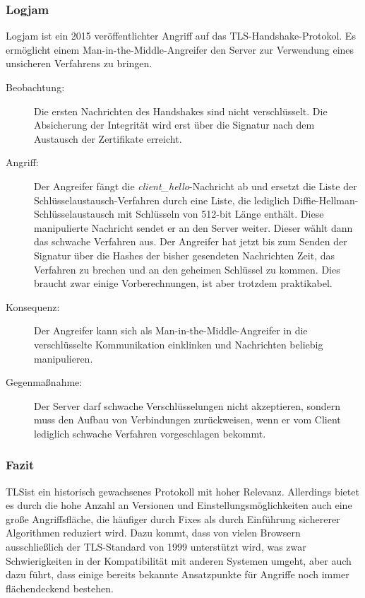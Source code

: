 \subsubsection{Logjam}
Logjam\cite{Adrian2015} ist ein 2015 veröffentlichter Angriff auf das
TLS-Handshake-Protokol. Es ermöglicht einem Man-in-the-Middle-Angreifer
den Server zur Verwendung eines unsicheren Verfahrens zu bringen.
\begin{description}
\item[Beobachtung:] 
  Die ersten Nachrichten des Handshakes sind nicht verschlüsselt. Die
  Absicherung der Integrität wird erst über die Signatur nach dem
  Austausch der Zertifikate erreicht.
\item[Angriff:] Der Angreifer fängt die \emph{client\_hello}-Nachricht ab
  und ersetzt die Liste der Schlüsselaustausch-Verfahren durch eine
  Liste, die lediglich Diffie-Hellman-Schlüsselaustausch mit Schlüsseln
  von 512-bit Länge enthält. Diese manipulierte Nachricht sendet er an
  den Server weiter. Dieser wählt dann das schwache Verfahren aus.
  Der Angreifer hat jetzt bis zum Senden der Signatur über die Hashes
  der bisher gesendeten Nachrichten Zeit, das Verfahren zu brechen und
  an den geheimen Schlüssel zu kommen. Dies braucht zwar einige
  Vorberechnungen, ist aber trotzdem praktikabel.
\item[Konsequenz:] Der Angreifer kann sich als
  Man-in-the-Middle-Angreifer in die verschlüsselte Kommunikation
  einklinken und Nachrichten beliebig manipulieren.
\item[Gegenmaßnahme:] Der Server darf schwache Verschlüsselungen nicht
  akzeptieren, sondern muss den Aufbau von Verbindungen zurückweisen,
  wenn er vom Client lediglich schwache Verfahren vorgeschlagen bekommt.
\end{description}

\subsubsection{Fazit}
TLS\indexTLS ist ein historisch gewachsenes Protokoll mit hoher
Relevanz. Allerdings bietet es durch die hohe Anzahl an Versionen und
Einstellungsmöglichkeiten auch eine große Angriffsfläche, die häufiger
durch Fixes als durch Einführung sichererer Algorithmen reduziert
wird. Dazu kommt, dass von vielen Browsern ausschließlich der
TLS-Standard von 1999 unterstützt wird, was zwar Schwierigkeiten in der
Kompatibilität mit anderen Systemen umgeht, aber auch dazu führt, dass
einige bereits bekannte Ansatzpunkte für Angriffe noch immer
flächendeckend bestehen.

